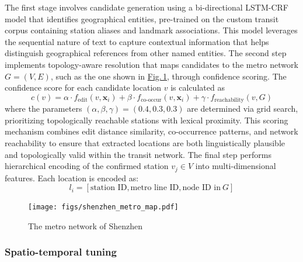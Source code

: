 \documentclass[a4paper,fleqn,12pt]{cas-sc}
\begin{document}
The first stage involves candidate generation using a bi-directional LSTM-CRF model that identifies geographical entities, pre-trained on the custom transit corpus containing station aliases and landmark associations. This model leverages the sequential nature of text to capture contextual information that helps distinguish geographical references from other named entities. The second step implements topology-aware resolution that maps candidates to the metro network $G=(V,E)$, such as the one shown in \hyperref[fig:SZ_network]{Fig.\,\ref{fig:SZ_network}}, through confidence scoring. The confidence score for each candidate location $v$ is calculated as
\begin{equation}
c(v) = \alpha \cdot f_{\text{edit}}(v,\boldsymbol{x}_i) + \beta \cdot f_{\text{co-occur}}(v,\boldsymbol{x}_i) + \gamma \cdot f_{\text{reachability}}(v,G)
\end{equation}
where the parameters $(\alpha,\beta,\gamma)=(0.4,0.3,0.3)$ are determined via grid search, prioritizing topologically reachable stations with lexical proximity. This scoring mechanism combines edit distance similarity, co-occurrence patterns, and network reachability to ensure that extracted locations are both linguistically plausible and topologically valid within the transit network. The final step performs hierarchical encoding of the confirmed station $v_j \in V$ into multi-dimensional features. Each location is encoded as:
\begin{equation}
l_i = [\text{station ID}, \text{metro line ID}, \text{node ID in}~G]
\end{equation}

\begin{figure}[htbp]
\centering
\texttt{[image: figs/shenzhen\_metro\_map.pdf]}
\caption{The metro network of Shenzhen}\label{fig:SZ_network}
\end{figure} 

\subsubsection{Spatio-temporal tuning}
\end{document}
